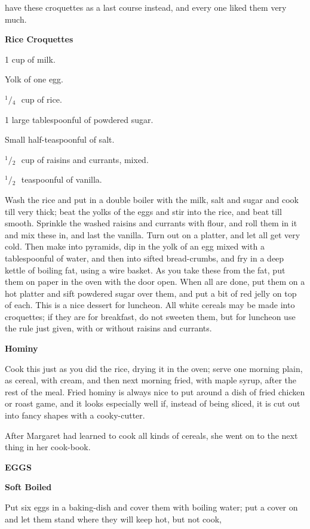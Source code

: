 \documentclass[11pt]{book}
\newcommand{\indpar}{\par\noindent\hspace*{\parindent}}
\newcommand{\ingredient}{\indpar}
\newcommand{\instruction}{\indpar}
\newcommand{\OneHalf}{\ensuremath{{}^1\!\!/\!{}_2\mbox{\ }}}
\newcommand{\OneQuarter}{\ensuremath{{}^1\!\!/\!{}_4\mbox{\ }}}
\newenvironment{RecipeTitle}{\medskip\begin{center}\large\bf }{\end{center}\smallskip}
\newenvironment{FoodTypeTitle}{\begin{center}\large\bf }{\end{center}}
\begin{document}
have these croquettes as a last course instead, and every one liked them
very much.
\begin{RecipeTitle}
Rice Croquettes\label{rice_croquettes}
\end{RecipeTitle}
\ingredient  1 cup of milk.
\ingredient  Yolk of one egg.
\ingredient  \OneQuarter cup of rice.
\ingredient  1 large tablespoonful of powdered sugar.
\ingredient  Small half-teaspoonful of salt.
\ingredient  \OneHalf cup of raisins and currants, mixed.
\ingredient  \OneHalf teaspoonful of vanilla.
\instruction
  Wash the rice and put in a double boiler with the milk, salt and
sugar and cook till very thick; beat the yolks of the eggs and stir into
the rice, and beat till smooth.  Sprinkle the washed raisins and currants
with flour, and roll them in it and mix these in, and last the vanilla.
Turn out on a platter, and let all get very cold.  Then make into
pyramids, dip in the yolk of an egg mixed with a tablespoonful of water,
and then into sifted bread-crumbs, and fry in a deep kettle of boiling
fat, using a wire basket.  As you take these from the fat, put them on
paper in the oven with the door open.  When all are done, put them on a
hot platter and sift powdered sugar over them, and put a bit of red
jelly on top of each.  This is a nice dessert for luncheon.  All white
cereals may be made into croquettes; if they are for breakfast, do not
sweeten them, but for luncheon use the rule just given, with or without
raisins and currants.
\begin{RecipeTitle}
Hominy\label{hominy}
\end{RecipeTitle}
\instruction
  Cook this just as you did the rice, drying it in the oven; serve one
morning plain, as cereal, with cream, and then next morning fried, with
maple syrup, after the rest of the meal.  Fried hominy is always nice
to put around a dish of fried chicken or roast game, and it looks
especially well if, instead of being sliced, it is cut out into fancy
shapes with a cooky-cutter.
\indpar
  After Margaret had learned to cook all kinds of cereals, she went on
to the next thing in her cook-book.
\bigskip
\begin{FoodTypeTitle}
EGGS\label{EGGS}
\end{FoodTypeTitle}
\vspace*{-3.0ex}
\begin{RecipeTitle}
Soft Boiled\label{soft_boiled_eggs}
\end{RecipeTitle}
\instruction
  Put six eggs in a baking-dish and cover them with boiling water; put
a cover on and let them stand where they will keep hot, but not cook,
\end{document}
